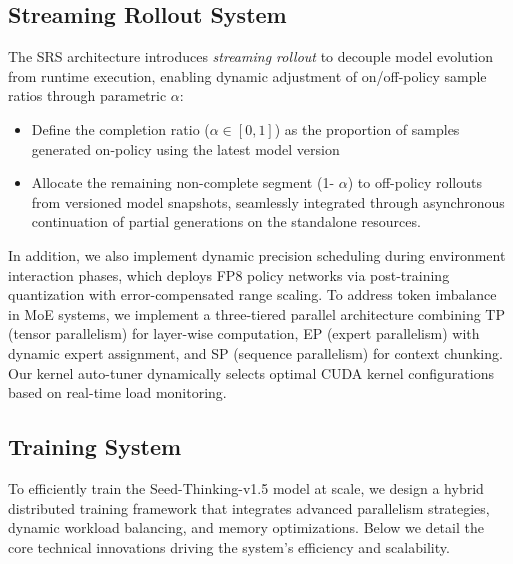 \subsection{Streaming Rollout System}
The SRS architecture introduces \textit{streaming rollout} to decouple model evolution from runtime execution, enabling dynamic adjustment of on/off-policy sample ratios through parametric $\alpha$:
\begin{itemize}
\item Define the completion ratio ($\alpha \in [0,1]$) as the proportion of samples generated on-policy using the latest model version
\item Allocate the remaining non-complete segment (1- $\alpha $) to off-policy rollouts from versioned model snapshots, seamlessly integrated through asynchronous continuation of partial generations on the standalone resources.
\end{itemize}

In addition, we also implement dynamic precision scheduling during environment interaction phases, which deploys FP8 policy networks via post-training quantization with error-compensated range scaling. %
To address token imbalance in MoE systems, we implement a three-tiered parallel architecture combining TP (tensor parallelism) for layer-wise computation, EP (expert parallelism) with dynamic expert assignment, and SP (sequence parallelism) for context chunking. Our kernel auto-tuner dynamically selects optimal CUDA kernel configurations based on real-time load monitoring.


\subsection{Training System}

To efficiently train the Seed-Thinking-v1.5 model at scale, we design a hybrid distributed training framework that integrates advanced parallelism strategies, dynamic workload balancing, and memory optimizations. Below we detail the core technical innovations driving the system’s efficiency and scalability.


